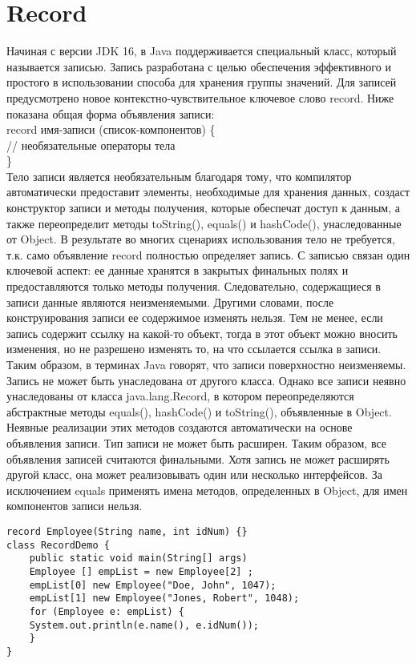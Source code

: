 \section{Record}
Начиная с версии JDK 16, в Java поддерживается специальный класс, который называется записью. Запись разработана с целью обеспечения эффективного и простого в использовании способа для хранения группы значений. Для записей предусмотрено новое контекстно-чувствительное ключевое слово record. Ниже показана общая форма объявления записи: \\
record имя-записи (список-компонентов) \{ \\
// необязательные операторы тела  \\
\} \\
Тело записи является необязательным благодаря тому, что компилятор автоматически предоставит элементы, необходимые для хранения данных, создаст конструктор записи и методы получения, которые обеспечат доступ к данным, а также переопределит методы toString(), equals() и hashCode(), унаследованные от Object. В результате во многих сценариях использования тело не требуется, т.к. само объявление record полностью определяет запись. С записью связан один ключевой аспект: ее данные хранятся в закрытых финальных полях и предоставляются только методы получения. Следовательно, содержащиеся в записи данные являются неизменяемыми. Другими словами, после конструирования записи ее содержимое изменять нельзя. Тем не менее, если запись содержит ссылку на какой-то объект, тогда в этот объект можно вносить изменения, но не разрешено изменять то, на что ссылается ссылка в записи. Таким образом, в терминах Java говорят, что записи поверхностно неизменяемы. Запись не может быть унаследована от другого класса. Однако все записи неявно унаследованы от класса java.lang.Record, в котором переопределяются абстрактные методы equals(), hashCode() и toString(), объявленные в Object. Неявные реализации этих методов создаются автоматически на основе объявления записи. Тип записи не может быть расширен. Таким образом, все объявления записей считаются финальными. Хотя запись не может расширять другой класс, она может реализовывать один или несколько интерфейсов. За исключением equals применять имена методов, определенных в Object, для имен компонентов записи нельзя.
\begin{lstlisting}
record Employee(String name, int idNum) {}
class RecordDemo {
    public static void main(String[] args)
    Employee [] empList = new Employee[2] ;
    empList[0] new Employee("Doe, John", 1047);
    empList[1] new Employee("Jones, Robert", 1048);
    for (Employee e: empList) {
    System.out.println(e.name(), e.idNum());
    }
}  
\end{lstlisting}
